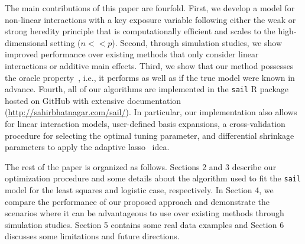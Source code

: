 \documentclass[12pt,letter]{article}\usepackage[]{graphicx}\usepackage[]{color}
\newcommand{\xmark}{\ding{55}}%
\begin{document}
The main contributions of this paper are fourfold. 
First, we develop a model for non-linear interactions with a key exposure variable following either the weak or strong heredity principle that is computationally efficient and scales to the high-dimensional setting ($n << p$). 
Second, through simulation studies, we show improved performance over existing methods that only consider linear interactions or additive main effects. 
Third, we show that our method possesses the oracle property~\citep{fan2001variable}, i.e., it performs as well as if the true model were known in advance. 
Fourth, all of our algorithms are implemented in the \texttt{sail} R package hosted on GitHub with extensive documentation (\url{http://sahirbhatnagar.com/sail/}). In particular, our implementation also allows for linear interaction models, user-defined basis expansions, a cross-validation procedure for selecting the optimal tuning parameter, and differential shrinkage parameters to apply the adaptive lasso~\citep{zou2006adaptive} idea. 

The rest of the paper is organized as follows. Sections 2 and 3 describe our optimization procedure and some details about the algorithm used to fit the \texttt{sail} model for the least squares and logistic case, respectively. In Section 4, we compare the performance of our proposed approach and demonstrate the scenarios where it can be advantageous to use over existing methods through simulation studies. Section 5 contains some real data examples and Section 6 discusses some limitations and future directions. 

\end{document}
